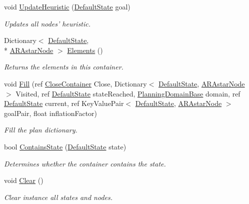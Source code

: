 \begin{DoxyCompactItemize}
void \hyperlink{class_plan_container_a16e1e615e844f1164867046b526b3ef1}{Update\-Heuristic} (\hyperlink{class_default_state}{Default\-State} goal)
\begin{DoxyCompactList}\small\item\em Updates all nodes' heuristic. \end{DoxyCompactList}\item 
Dictionary$<$ \hyperlink{class_default_state}{Default\-State}, \\*
\hyperlink{class_a_r_astar_node}{A\-R\-Astar\-Node} $>$ \hyperlink{class_plan_container_a317026e533d9ccc429cc7552cbaf0a86}{Elements} ()
\begin{DoxyCompactList}\small\item\em Returns the elements in this container. \end{DoxyCompactList}\item 
void \hyperlink{class_plan_container_aaae2bc99a50902c06aeb128b9152b4f0}{Fill} (ref \hyperlink{class_close_container}{Close\-Container} Close, Dictionary$<$ \hyperlink{class_default_state}{Default\-State}, \hyperlink{class_a_r_astar_node}{A\-R\-Astar\-Node} $>$ Visited, ref \hyperlink{class_default_state}{Default\-State} state\-Reached, \hyperlink{class_planning_domain_base}{Planning\-Domain\-Base} domain, ref \hyperlink{class_default_state}{Default\-State} current, ref Key\-Value\-Pair$<$ \hyperlink{class_default_state}{Default\-State}, \hyperlink{class_a_r_astar_node}{A\-R\-Astar\-Node} $>$ goal\-Pair, float inflation\-Factor)
\begin{DoxyCompactList}\small\item\em Fill the plan dictionary. \end{DoxyCompactList}\item 
bool \hyperlink{class_plan_container_a49a5878c3e1d12926d9bac5b93ab8fbc}{Contains\-State} (\hyperlink{class_default_state}{Default\-State} state)
\begin{DoxyCompactList}\small\item\em Determines whether the container contains the state. \end{DoxyCompactList}\item 
void \hyperlink{class_plan_container_a16479b9695345f4ca9385f85f4632716}{Clear} ()
\begin{DoxyCompactList}\small\item\em Clear instance all states and nodes. \end{DoxyCompactList}\end{DoxyCompactItemize}


